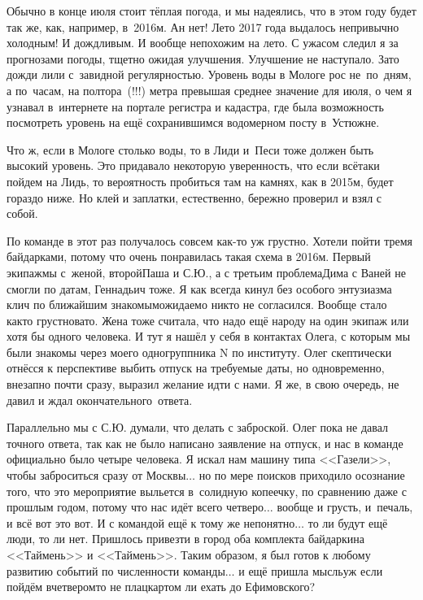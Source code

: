 Обычно в конце июля стоит тёплая погода, и мы надеялись, что в этом году будет так же, как, например, в~2016\sdash м. Ан нет! Лето 2017 года выдалось непривычно холодным! И дождливым. И вообще непохожим на лето. С ужасом следил я за прогнозами погоды, тщетно ожидая улучшения. Улучшение не наступало. Зато дожди лили с~завидной регулярностью. Уровень воды в Мологе рос не~по~дням, а по~часам, на полтора~(!!!) метра превышая среднее значение для июля, о чем я узнавал в~интернете на портале регистра и кадастра, где была возможность посмотреть уровень на ещё сохранившимся водомерном посту в~Устюжне. 

Что ж, если в Мологе столько воды, то в Лиди и~Песи тоже должен быть высокий уровень. Это придавало некоторую уверенность, что если всё\sdash таки пойдем на Лидь, то вероятность пробиться там на камнях, как в 2015\sdash м, будет гораздо ниже. Но клей и заплатки, естественно, бережно проверил и взял с собой.

По команде в этот раз получалось совсем как-то уж грустно. 
Хотели пойти тремя байдарками, потому что очень понравилась такая схема в 2016\sdash м. Первый экипаж\mdash мы с~женой, второй\mdash Паша и С.Ю., а с третьим проблема\mdash Дима с Ваней не смогли по датам, Геннадьич тоже. Я как всегда кинул без особого энтузиазма клич по ближайшим знакомым\mdash ожидаемо никто не согласился. Вообще стало как\sdash то грустновато. Жена тоже считала, что надо ещё народу на один экипаж или хотя бы одного человека. И тут я нашёл у себя в контактах Олега, с которым мы были знакомы через моего одногруппника N по институту. Олег скептически отнёсся к перспективе выбить отпуск на требуемые даты, но одновременно, внезапно почти сразу, выразил желание идти с нами. Я же, в свою очередь, не давил и ждал окончательного~ответа. 

Параллельно мы с С.Ю. думали, что делать с заброской. Олег пока не давал точного ответа, так как не было написано заявление на отпуск, и нас в команде официально было четыре человека. Я искал нам машину типа <<Газели>>, чтобы заброситься сразу от Москвы$\ldots$ но по мере поисков приходило осознание того, что это мероприятие выльется в~солидную копеечку, по сравнению даже с прошлым годом, потому что нас идёт всего четверо$\ldots$ вообще и грусть, и~печаль, и всё вот это вот. И с командой ещё к тому же непонятно$\ldots$ то ли будут ещё люди, то ли нет. Пришлось привезти в город оба комплекта байдарки\mdash на <<Таймень>> и <<Таймень>>. Таким образом, я был готов к любому развитию событий по численности команды$\ldots$ и ещё пришла мысль\mdash уж если пойдём вчетвером\mdash то не плацкартом ли ехать до Ефимовского?

